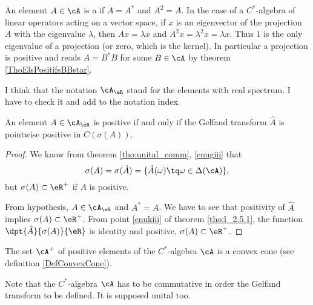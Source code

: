An element $A\in\cA$ is a  if $A=A^*$ and $A^2=A$. In the case of a $C^*$-algebra of linear operators acting on a vector space, if $x$ is an eigenvector of the projection $A$ with the eigenvalue $\lambda$, then $Ax=\lambda x$ and $A^2x=\lambda^2x=\lambda x$. Thus $1$ is the only eigenvalue of a projection (or zero, which is the kernel). In particular a projection is positive and reads\label{PgProjPositif} $A=B^*B$ for some $B\in \cA$ by theorem \ref{ThoElsPositifsBBstar}.

\begin{probleme}
    I think that the notation \(\cA_{\eR}\) stand for the elements with real spectrum. I have to check it and add to the notation index.
\end{probleme}

\begin{proposition}
An element $A\in\cA_{\eR}$ is positive if and only if the Gelfand transform $\hat A$ is pointwise positive in $C(\sigma(A))$.
\end{proposition}

\begin{proof}
We know from theorem \ref{tho:unital_comm}, \ref{enugiii} that
\[ 
  \sigma(A)=\sigma(\hat A)=\{ \hat A(\omega)\tq\omega\in\Delta(\cA) \}, 
\]
but $\sigma(A)\subset\eR^+$ if $A$ is positive.

From hypothesis, $A\in\cA_{\eR}$ and $A^*=A$. We have to see that positivity of $\hat A$ implies $\sigma(A)\subset\eR^+$. From point \ref{enukiii} of theorem \ref{tho:l_2.5.1}, the function $\dpt{\hat A}{\sigma(A)}{\eR}$ is identity and positive, $\sigma(A)\subset\eR^+$.

\end{proof}

 
\begin{proposition}     \label{PropAplusConvexCone}
    The set $\cA^+$ of positive elements of the $C^*$-algebra $\cA$ is a convex cone (see definition \ref{DefConvexCone}).
\end{proposition}

Note that the $C^*$-algebra $\cA$ has to be commutative in order the Gelfand transform to be defined. It is supposed unital too. 


